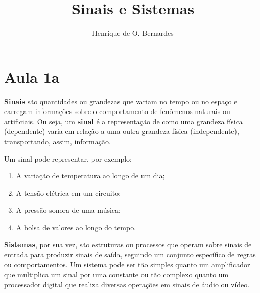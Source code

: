 \documentclass{article}
\begin{document}
\newcommand{\makeboxlabel}[1]{\fbox{#1.}\hfill}%
\newenvironment{boxlabel}
  {\begin{list}
    {\arabic{boxlblcounter}}
    {\usecounter{boxlblcounter}
     \setlength{\labelwidth}{3em}
     \setlength{\labelsep}{0em}
     \setlength{\itemsep}{2pt}
     \setlength{\leftmargin}{1.5cm}
     \setlength{\rightmargin}{2cm}
     \setlength{\itemindent}{0em} 
     \let\makelabel=\makeboxlabel
    }
  }
{\end{list}}

\newenvironment{boxedd}
    {
     \begin{center}
    \begin{tabular}{|p{1\textwidth}|}
    \hline
    }
    { 
    \\\\\hline
    \end{tabular} 
    \end{center}
    }



\title{Sinais e Sistemas}
\author{Henrique de O. Bernardes}
\maketitle
\thispagestyle{empty}
\section{Aula 1a}
\textbf{Sinais} são quantidades ou grandezas que variam no tempo ou no espaço e carregam informações sobre o comportamento de fenômenos naturais ou artificiais. Ou seja, um \textbf{sinal} é a representação de como uma grandeza física (dependente) varia em relação a uma outra grandeza física (independente), transportando, assim, informação.

Um sinal pode representar, por exemplo:
\begin{enumerate}
  \item A variação de temperatura ao longo de um dia;
  \item A tensão elétrica em um circuito;
  \item A pressão sonora de uma música;
  \item A bolsa de valores ao longo do tempo.
\end{enumerate}

\textbf{Sistemas}, por sua vez, são estruturas ou processos que operam sobre sinais de entrada para produzir sinais de saída, seguindo um conjunto específico de regras ou comportamentos.
Um sistema pode ser tão simples quanto um amplificador que multiplica um sinal por uma constante ou tão complexo quanto um processador digital que realiza diversas operações em sinais de áudio ou vídeo.
\end{document}

